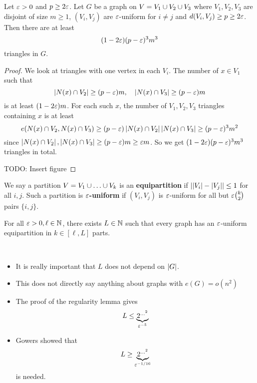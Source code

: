 \documentclass{article}
\begin{document}
\begin{lem}
  Let $\varepsilon > 0$ and $p \ge 2\varepsilon$. Let $G$ be a graph on $V = V_1 \cup V_2 \cup V_3$ where $V_1, V_2, V_3$ are disjoint of size $m \ge 1$, $(V_i, V_j)$ are $\varepsilon$-uniform for $i \ne j$ and $d(V_i, V_j) \ge p \ge 2\varepsilon$. Then there are at least
  $$(1 - 2\varepsilon)(p - \varepsilon)^3m^3$$
  triangles in $G$.
\end{lem}
\begin{proof}
  We look at triangles with one vertex in each $V_i$. The number of $x \in V_1$ such that
  $$\left\lvert N(x) \cap V_2\right\rvert \ge (p - \varepsilon)m, \quad \left\lvert N(x) \cap V_3\right\rvert \ge (p - \varepsilon)m$$
  is at least $(1 - 2\varepsilon)m$. For each such $x$, the number of $V_1, V_2, V_3$ triangles containing $x$ is at least
  $$e(N(x) \cap V_2, N(x) \cap V_3) \ge (p - \varepsilon)\left\lvert N(x) \cap V_2\right\rvert \left\lvert N(x) \cap V_3\right\rvert \ge (p - \varepsilon)^3m^2$$
  since $\left\lvert N(x) \cap V_2\right\rvert, \left\lvert N(x) \cap V_3\right\rvert \ge (p - \varepsilon)m \ge \varepsilon m$. So we get $(1 - 2\varepsilon)(p - \varepsilon)^3m^3$ triangles in total.

  TODO: Insert figure
\end{proof}

\begin{dfn}
  We say a partition $V = V_1 \union \dots \union V_k$ is an {\bf equipartition} if $\left\lvert \left\lvert V_i\right\rvert - \left\lvert V_j\right\rvert\right\rvert \le 1$ for all $i, j$. Such a partition is {\bf $\varepsilon$-uniform} if $(V_i, V_j)$ is $\varepsilon$-uniform for all but $\varepsilon\binom k2$ pairs $\{i, j\}$.
\end{dfn}

\begin{thm}
  For all $\varepsilon > 0, \ell \in \mathbb N$, there exists $L \in \mathbb N$ such that every graph has an $\varepsilon$-uniform equipartition in $k \in [\ell, L]$ parts.
\end{thm}
\begin{rmks}~
  \begin{itemize}
    \item It is really important that $L$ does not depend on $\left\lvert G\right\rvert$.
    \item This does not directly say anything about graphs with $e(G) = o(n^2)$
    \item The proof of the regularity lemma gives
    $$L \le \underbrace{2^{\dots^2}}_{\varepsilon^{-5}}$$
    \item Gowers showed that
    $$L \ge \underbrace{2^{\dots^2}}_{\varepsilon^{-1/16}}$$
    is needed.
  \end{itemize}
\end{rmks}
\end{document}
